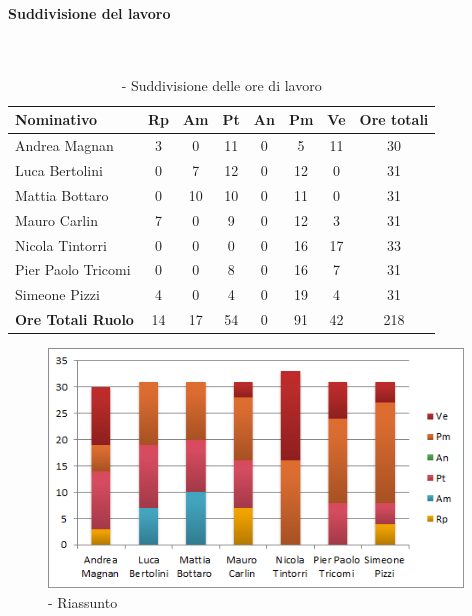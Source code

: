 \documentclass[./PianoDiProgetto.tex]{subfiles}
\begin{document}
	\subsubsection{\PerC}
				\paragraph{Suddivisione del lavoro}\
						
	\begin{table}[H]
		\begin{tabularx}{\textwidth}{l  * {6}{c}  c}
			\toprule
			\textbf{Nominativo} & \textbf{Rp} & \textbf{Am} & \textbf{Pt} 
						& \textbf{An} & \textbf{Pm} & \textbf{Ve} & \textbf{Ore totali} \\
			\midrule
			Andrea Magnan  & 3 & 0 & 11 & 0 & 5 & 11 & 30 \\
			Luca Bertolini  & 0 & 7 & 12 & 0 & 12 & 0 & 31 \\
			Mattia Bottaro  & 0 & 10 & 10 & 0 & 11 & 0 & 31 \\
			Mauro Carlin  & 7 & 0 & 9 & 0 & 12 & 3 & 31 \\
			Nicola Tintorri  & 0 & 0 & 0 & 0 & 16 & 17 & 33 \\
			Pier Paolo Tricomi  & 0 & 0 & 8 & 0 & 16 & 7 & 31 \\
			Simeone Pizzi & 4 & 0 & 4 & 0 & 19 & 4 & 31 \\
			\midrule
			\textbf{Ore Totali Ruolo} & 14 & 17 & 54 & 0 & 91 & 42 & 218 \\
			\bottomrule
			
		\end{tabularx}
		\caption{\PerC{} - Suddivisione delle ore di lavoro}
	\end{table}
	
\vfill	
		
	\begin{figure}[H]
		\centering
		\includegraphics[width=11cm, trim=1cm 0cm 1cm 0cm]{grafici/C-persona}
			\caption{\PerC{}- Riassunto}
	\end{figure}
\vfill	
	
\end{document}

